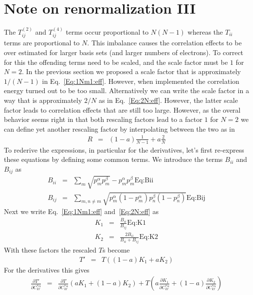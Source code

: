\documentclass[pra,nofootinbib]{revtex4-1}
\newcommand{\dlabel}[1]{\text{#1}\label{#1}}
\begin{document}
\section{Note on renormalization III}

The $T^{(2)}_{ij}$ and $T^{(4)}_{ij}$ terms occur proportional to $N(N-1)$ whereas
the $T_{ii}$ terms are proportional to $N$. This imbalance causes the correlation
effects to be over estimated for larger basis sets (and larger numbers of electrons).
To correct for this the offending terms need to be scaled, and the scale factor must
be $1$ for $N=2$. In the previous section we proposed a scale factor that is 
approximately $1/(N-1)$ in Eq.~\ref{Eq:1Nm1:eff}. However, when implemented the
correlation energy turned out to be too small. Alternatively we can write the
scale factor in a way that is approximately $2/N$ as in Eq.~\ref{Eq:2N:eff}.
However, the latter scale factor leads to correlation effects that are still
too large. However, as the overal behavior seems right in that both rescaling 
factors lead to a factor $1$ for $N=2$ we can define yet another rescaling
factor by interpolating between the two as in
\begin{eqnarray}
   R &=& (1-a)\frac{1}{N-1} + a\frac{2}{N}
\end{eqnarray}
To rederive the expressions, in particular for the derivatives, let's first re-express
these equations by defining some common terms. We introduce the terms $B_{ii}$ and
$B_{ij}$ as
\begin{eqnarray}
  B_{ii}
  &=& \sum_m \sqrt{p^\alpha_m p^\beta_m} - p^\alpha_m p^\beta_m 
      \dlabel{Eq:Bii} \\
  B_{ij}
  &=& \sum_{m,n \ne m} \sqrt{p^\alpha_m(1-p^\alpha_m)p^\beta_n(1-p^\beta_n)}
      \dlabel{Eq:Bij}
\end{eqnarray}
Next we write Eq.~\ref{Eq:1Nm1:eff} and~\ref{Eq:2N:eff} as
\begin{eqnarray}
  K_1 &=& \frac{B_{ii}}{B_{ij}}
          \dlabel{Eq:K1} \\
  K_2 &=& \frac{2B_{ii}}{B_{ii}+B_{ij}} 
          \dlabel{Eq:K2}
\end{eqnarray}
With these factors the rescaled $T$s become
\begin{eqnarray}
  T' &=& T\left((1-a) K_1 + a K_2\right) 
\end{eqnarray}
For the derivatives this gives
\begin{eqnarray}
  \frac{\partial T'}{\partial C^{*\alpha}_{kr}}
  &=& \frac{\partial T}{\partial C^{*\alpha}_{kr}}\left(a K_1 + (1-a) K_2\right) 
   +  T\left(a    \frac{\partial K_1}{\partial C^{*\alpha}_{kr}}
            +(1-a)\frac{\partial K_2}{\partial C^{*\alpha}_{kr}}\right)
\end{eqnarray}
\end{document}
